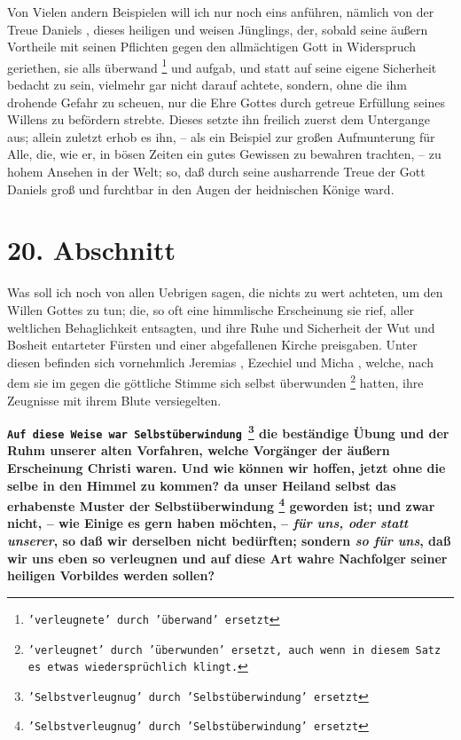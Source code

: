 Von Vielen andern Beispielen will ich nur noch eins anführen, nämlich von der
Treue Daniels , dieses heiligen  und
weisen Jünglings, der, sobald seine äußern
Vortheile mit seinen Pflichten gegen den allmächtigen Gott in Widerspruch
geriethen, sie alls überwand \footnote{\texttt{'verleugnete' durch 'überwand'
ersetzt}} und aufgab, und statt auf seine eigene
Sicherheit bedacht zu sein, vielmehr gar nicht darauf achtete, sondern, ohne die
ihm drohende Gefahr zu scheuen, nur die Ehre Gottes durch getreue Erfüllung
seines Willens zu befördern strebte. Dieses setzte ihn freilich zuerst dem
Untergange aus; allein zuletzt erhob es ihn, -- als ein Beispiel zur großen
Aufmunterung für Alle, die, wie er, in bösen Zeiten ein gutes Gewissen zu
bewahren trachten, -- zu hohem Ansehen in der Welt; so, daß durch seine
ausharrende Treue der Gott Daniels groß und furchtbar in den Augen der
heidnischen Könige ward.

\section{20. Abschnitt} \label{kap4_ab20}

Was soll ich noch von allen Uebrigen sagen, die nichts zu wert achteten, um den
Willen Gottes zu tun; die, so oft eine himmlische Erscheinung sie rief, aller
weltlichen Behaglichkeit entsagten, und ihre Ruhe und Sicherheit der Wut und
Bosheit entarteter Fürsten und einer abgefallenen Kirche  preisgaben. Unter
diesen befinden sich vornehmlich Jeremias , Ezechiel
 und Micha , welche, nach dem
sie im gegen die göttliche Stimme sich selbst überwunden
\footnote{\texttt{'verleugnet' durch 'überwunden' ersetzt, auch wenn in diesem Satz
es etwas wiedersprüchlich klingt.}} hatten, ihre Zeugnisse
mit ihrem Blute versiegelten.

\medskip

  \textbf{\texttt{Auf diese Weise war Selbstüberwindung \footnote{'Selbstverleugnug' durch 'Selbstüberwindung' ersetzt}}
die beständige Übung und der Ruhm
unserer alten Vorfahren, welche Vorgänger der äußern Erscheinung Christi waren.
Und wie können wir hoffen, jetzt ohne die selbe in den Himmel  zu kommen? da
unser Heiland selbst das erhabenste Muster der Selbstüberwindung \footnote{\texttt{'Selbstverleugnug' durch 'Selbstüberwindung' ersetzt}} geworden ist;
und zwar nicht, -- wie Einige es gern haben möchten, -- \textit{für uns, oder
statt
unserer}, so daß wir derselben nicht bedürften; sondern \textit{so für uns}, daß
wir
uns eben so verleugnen und auf diese Art wahre Nachfolger seiner heiligen
Vorbildes werden sollen?}

